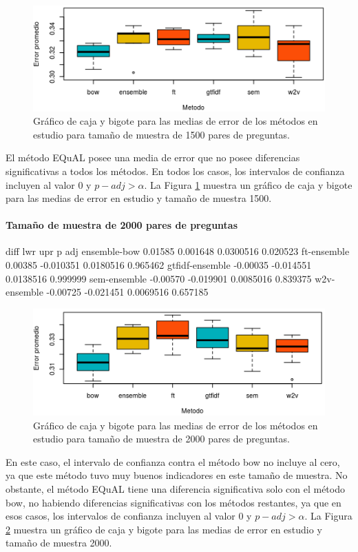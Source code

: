 \begin{figure}
	\centering
	\includegraphics[width=0.7\linewidth]{10_resultados/imagenes/anova_1500}
	\caption{Gráfico de caja y bigote para las medias de error de los métodos en estudio para tamaño de muestra de 1500 pares de preguntas.}
	\label{fig:anova1500}
\end{figure}

\bigskip El método EQuAL posee una media de error que no posee diferencias significativas a todos los métodos. En todos los casos, los intervalos de confianza incluyen al valor 0 y \(p-adj > \alpha\). La Figura \ref{fig:anova1500} muestra un gráfico de caja y bigote para las medias de error en estudio y tamaño de muestra 1500.

\bigskip
\paragraph{Tamaño de muestra de 2000 pares de preguntas}
\begin{rc}
                  diff       lwr       upr      p adj
ensemble-bow     0.01585  0.001648 0.0300516 0.020523
ft-ensemble      0.00385 -0.010351 0.0180516 0.965462
gtfidf-ensemble -0.00035 -0.014551 0.0138516 0.999999
sem-ensemble    -0.00570 -0.019901 0.0085016 0.839375
w2v-ensemble    -0.00725 -0.021451 0.0069516 0.657185
\end{rc}

\begin{figure}
	\centering
	\includegraphics[width=0.7\linewidth]{10_resultados/imagenes/anova_2000}
	\caption{Gráfico de caja y bigote para las medias de error de los métodos en estudio para tamaño de muestra de 2000 pares de preguntas.}
	\label{fig:anova2000}
\end{figure}

\bigskip En este caso, el intervalo de confianza contra el método bow no incluye al cero, ya que este método tuvo muy buenos indicadores en este tamaño de muestra. No obstante, el método EQuAL tiene una diferencia significativa solo con el método bow, no habiendo diferencias significativas con los métodos restantes, ya que en esos casos, los intervalos de confianza incluyen al valor \(0\) y \(p-adj > \alpha\). La Figura \ref{fig:anova2000} muestra un gráfico de caja y bigote para las medias de error en estudio y tamaño de muestra 2000.

